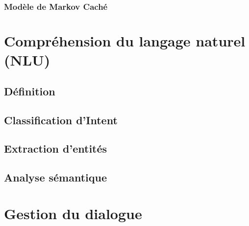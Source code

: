 			\paragraph{}
		\subsubsection{Modèle de Markov Caché}
			\paragraph{}
\section{Compréhension du langage naturel (NLU)}
	\paragraph{}
	\subsection{Définition}
		\paragraph{}
	\subsection{Classification d'Intent}
		\paragraph{}
	\subsection{Extraction d'entités}
		\paragraph{}
	\subsection{Analyse sémantique}

\section{Gestion du dialogue}
	\paragraph{}

